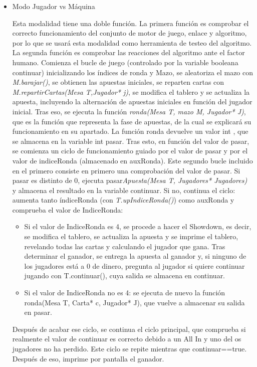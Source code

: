 \begin{itemize}
\item Modo Jugador vs Máquina

Esta modalidad tiene una doble función. La primera función es comprobar el correcto funcionamiento del conjunto de motor de juego, enlace y algoritmo, por lo que se usará esta modalidad como herramienta de testeo del algoritmo. La segunda función es comprobar las reacciones del algoritmo ante el factor humano.
Comienza el bucle de juego (controlado por la variable booleana continuar) inicializando los índices de ronda y Mazo, se aleatoriza el mazo con \textit{M.barajar()}, se obtienen las apuestas iniciales, se reparten cartas con \textit{M.repartirCartas(Mesa T,Jugador* j)}, se modifica el tablero y se actualiza la apuesta, incluyendo la alternación de apuestas iniciales en función del jugador inicial. Tras eso, se ejecuta la función \textit{ronda(Mesa T, mazo M, Jugador* J)}, que es la función que representa la fase de apuestas, de la cual se explicará su funcionamiento en su apartado. 
La función ronda devuelve un valor int , que se almacena en la variable int pasar. Tras esto, en función del valor de pasar, se comienza un ciclo de funcionamiento guiado por el valor de pasar y por el valor de indiceRonda (almacenado en auxRonda).
Este segundo bucle incluido en el primero consiste en primero una comprobación del valor de pasar. Si pasar es distinto de 0, ejecuta pasar\textit{Apuesta(Mesa T, Jugadores* Jugadores)} y almacena el resultado en la variable continuar. Si no, continua el ciclo: aumenta tanto índiceRonda (con \textit{T.upIndiceRonda()}) como auxRonda y comprueba el valor de IndiceRonda:
\begin{itemize}
\item Si el valor de IndiceRonda es 4, se procede a hacer el Showdown, es decir, se modifica el tablero, se actualiza la apuesta y se imprime el tablero, revelando todas las cartas y calculando el jugador que gana. Tras determinar el ganador, se entrega la apuesta al ganador y, si ninguno de los jugadores está a 0 de dinero, pregunta al jugador si quiere continuar jugando con T.continuar(), cuya salida se almacena en continuar.
\item Si el valor de IndiceRonda no es 4: se ejecuta de nuevo la función ronda(Mesa T, Carta* c, Jugador* J), que vuelve a almacenar su salida en pasar.
 \end{itemize}
Después de acabar ese ciclo, se continua el ciclo principal, que comprueba si realmente el valor de continuar es correcto debido a un All In y uno del os jugadores no ha perdido.
Este ciclo se repite mientras que continuar==true. Después de eso, imprime por pantalla el ganador.


\end{itemize}

